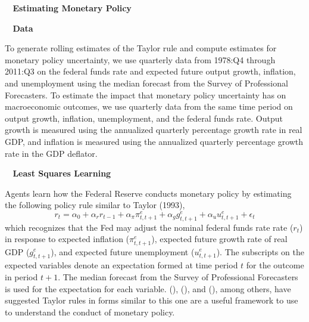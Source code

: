 \documentclass[12pt]{article}
\newcommand{\beq}{\begin{equation}}
\newcommand{\eeq}{\end{equation}}
\newcommand{\citee}[1]{\citeauthor{#1} (\citeyear{#1})}
\renewcommand{\section}[1]{\addtocounter{section}{1} \begin{center}\textbf{\thesection~ #1}\end{center}}
\renewcommand{\subsection}[1]{\addtocounter{subsection}{1}\begin{center}\textbf{\thesubsection~ #1}\end{center}}
\begin{document}
\section{Estimating Monetary Policy}
\subsection{Data}
To generate rolling estimates of the Taylor rule and compute estimates for monetary policy uncertainty, we use quarterly data from 1978:Q4 through 2011:Q3 on the federal funds rate and expected future output growth, inflation, and unemployment using the median forecast from the Survey of Professional Forecasters.  To estimate the impact that monetary policy uncertainty has on macroeconomic outcomes, we use quarterly data from the same time period on output growth, inflation, unemployment, and the federal funds rate.  Output growth is measured using the annualized quarterly percentage growth rate in real GDP, and inflation is measured using the annualized quarterly percentage growth rate in the GDP deflator.  

\subsection{Least Squares Learning}
Agents learn how the Federal Reserve conducts monetary policy by estimating the following policy rule similar to Taylor (1993),
\beq \label{eq:taylor} r_t = \alpha_0 + \alpha_r r_{t-1} + \alpha_{\pi} \pi_{t,t+1}^e + \alpha_g g_{t,t+1}^e + \alpha_u u_{t,t+1}^e + \epsilon_t \eeq
which recognizes that the Fed may adjust the nominal federal funds rate rate ($r_t$) in response to expected inflation ($\pi_{t,t+1}^e$), expected future growth rate of real GDP ($g_{t,t+1}^e$), and expected future unemployment ($u_{t,t+1}^e$).  The subscripts on the expected variables denote an expectation formed at time period $t$ for the outcome in period $t+1$.  The median forecast from the Survey of Professional Forecasters is used for the expectation for each variable.  \citee{juddrude}, \citee{taylor1999}, and \citee{orphanides2003}, among others, have suggested Taylor rules in forms similar to this one are a useful framework to use to understand the conduct of monetary policy.  
\end{document}
